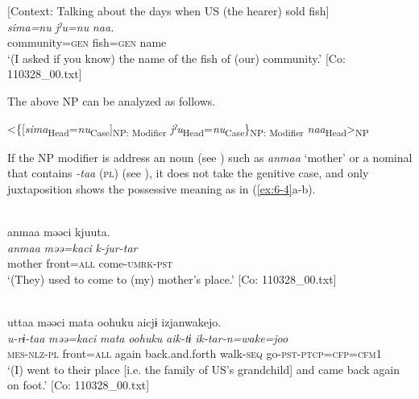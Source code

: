 \ea\label{ex:6-2}
   [Context: Talking about the days when US (the hearer) sold fish]\\
{\TM}
\glll \textit{sima=nu}  \textit{jˀu=nu}  \textit{naa.}\\
community=\textsc{gen}  fish=\textsc{gen}  name\\
\glt    ‘(I asked if you know) the name of the fish of (our) community.’ [Co: 110328\_00.txt]
\z

The above NP can be analyzed as follows.

\ea\label{ex:6-3}
 <\{[\textit{sima}\textsubscript{Head}=\textit{nu}\textsubscript{Case}]\textsubscript{NP: Modifier} \textit{jˀu}\textsubscript{Head}=\textit{nu}\textsubscript{Case}\}\textsubscript{NP: Modifier} \textit{naa}\textsubscript{Head}>\textsubscript{NP}
\z


If the NP modifier is address an noun (see ) such as \textit{anmaa} ‘mother’ or a nominal that contains \textit{-taa} (\textsc{pl}) (see ), it does not take the genitive case, and only juxtaposition shows the possessive meaning as in (\ref{ex:6-4}a-b).

\ea\label{ex:6-4}
\ea{}\\
{\TM}
\glll anmaa  məəci  kjuuta.\\
\textit{anmaa}  \textit{məə=kaci}  \textit{k-jur-tar}\\
mother  front=\textsc{all}  come-\textsc{umrk}-\textsc{pst}\\
\glt ‘(They) used to come to (my) mother’s place.’ [Co: 110328\_00.txt]

\ex{}\\
{\US}
\glll uttaa  məəci  mata  {\textbar}oohuku{\textbar}  aicjɨ                                                    izjanwakejo.                                            \\
      \textit{u-rɨ-taa}  \textit{məə=kaci}  \textit{mata}  \textit{oohuku}  \textit{aik-tɨ}                   \textit{ik-tar-n=wake=joo}                              \\
      \textsc{mes}-\textsc{nlz}-\textsc{pl}  front=\textsc{all}  again  back.and.forth  walk-\textsc{seq}     go-\textsc{pst}-\textsc{ptcp}=\textsc{cfp}=\textsc{cfm}1\\
\glt ‘(I) went to their place [i.e. the family of US’s grandchild] and came back again on foot.’ [Co: 110328\_00.txt]
\z
\z

